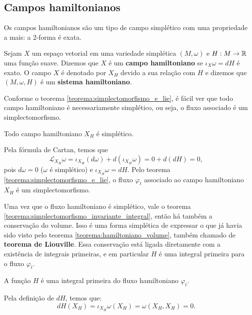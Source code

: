 \subsection{Campos hamiltonianos}

Os campos hamiltonianos são um tipo de campo simplético com uma propriedade a mais: a 2-forma é exata.

\begin{definition}
    Sejam $X$ um espaço vetorial em uma variedade simplética $(M, \omega)$ e $H: M \to \mathbb{R}$ uma função suave. Dizemos que $X$ é um \textbf{campo hamiltoniano} se $\iota_X \omega = dH$ é exato. O campo $X$ é denotado por $X_H$ devido a sua relação com $H$ e dizemos que $(M, \omega, H)$ é um \textbf{sistema hamiltoniano}.
\end{definition}

Conforme o teorema \ref{teorema:simplectomorfismo_e_lie}, é fácil ver que todo campo hamiltoniano é necessariamente simplético, ou seja, o fluxo associado é um simplectomorfismo.

\begin{corollary}
    Todo campo hamiltoniano $X_H$ é simplético.
\end{corollary}
\begin{Proof}
    Pela fórmula de Cartan, temos que
    \begin{equation*}
        \mathcal L_{X_H} \omega = \iota_{X_H} (d \omega) + d (\iota_{X_H} \omega) = 0 + d(dH) = 0, 
    \end{equation*}
    pois $d \omega = 0$ ($\omega$ é simplético) e $\iota_{X_H} \omega = dH$. Pelo teorema \ref{teorema:simplectomorfismo_e_lie}, o fluxo $\varphi_t$ associado ao campo hamiltoniano $X_H$ é um simplectomorfismo.
\end{Proof}

Uma vez que o fluxo hamiltoniano é simplético, vale o teorema \ref{teorema:simplectomorfismo_invariante_integral}, então há também a conservação do volume. Isso é uma forma simplética de expressar o que já havia sido visto pelo teorema \ref{teorema:hamiltoniano_volume}, também chamado de \textbf{teorema de Liouville}. Essa conservação está ligada diretamente com a existência de integrais primeiras, e em particular $H$  é uma integral primeira para o fluxo $\varphi_t$.

\begin{proposition}
    A função $H$ é uma integral primeira do fluxo hamiltoniano $\varphi_t$.
\end{proposition}
\begin{Proof}
    Pela definição de $dH$, temos que:
    \begin{equation*}
        dH(X_H) = \iota_{X_H} \omega (X_H) = \omega(X_H, X_H) = 0.
    \end{equation*}
\end{Proof}

